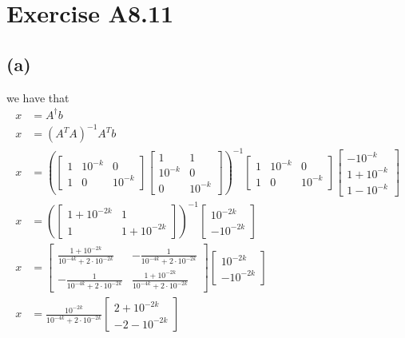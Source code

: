 \section*{Exercise A8.11}
\subsection*{(a)}
we have that 
\begin{align*}
    x&=A^{\dagger}b\\
    x&=(A^TA)^{-1}A^Tb\\
    x&=\left(\begin{bmatrix}
        1 & 10^{-k} & 0\\
        1 & 0 & 10^{-k}
    \end{bmatrix}
    \begin{bmatrix}
        1 & 1\\
        10^{-k} & 0\\
        0 & 10^{-k}
    \end{bmatrix}\right)^{-1}
    \begin{bmatrix}
        1 & 10^{-k} & 0\\
        1 & 0 & 10^{-k}
    \end{bmatrix}
    \begin{bmatrix}
        -10^{-k}\\
        1+10^{-k}\\
        1-10^{-k}
    \end{bmatrix}\\
    x&=\left(\begin{bmatrix}
        1+10^{-2k} & 1\\
        1 & 1+10^{-2k}
    \end{bmatrix}\right)^{-1}\begin{bmatrix}
        10^{-2k}\\
        -10^{-2k}
    \end{bmatrix}\\
    x&=\begin{bmatrix}\frac{1+10^{-2k}}{10^{-4k}+2\cdot10^{-2k}}&-\frac{1}{10^{-4k}+2\cdot10^{-2k}}\\ -\frac{1}{10^{-4k}+2\cdot10^{-2k}}&\frac{1+10^{-2k}}{10^{-4k}+2\cdot10^{-2k}}
    \end{bmatrix}\begin{bmatrix}
        10^{-2k}\\
        -10^{-2k}
    \end{bmatrix}\\
    x&=\frac{10^{-2k}}{10^{-4k}+2\cdot10^{-2k}}\begin{bmatrix}
        2+10^{-2k}\\
        -2-10^{-2k}
    \end{bmatrix}
\end{align*}
